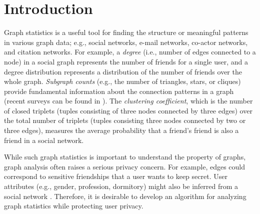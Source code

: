 \section{Introduction}
\label{sec:intro}
Graph statistics is a useful tool for finding the structure or meaningful patterns in various graph data; e.g., social networks, e-mail networks, co-actor networks, and citation networks. 
For example, 
a \textit{degree} (i.e., number of edges connected to a node) in a social graph represents the number of friends for a single user, and a degree distribution represents a distribution of the number of friends over the whole graph. 
\textit{Subgraph counts} 
(e.g., the number of triangles, stars, or cliques) provide fundamental information about the connection patterns in a graph (recent surveys can be found in \cite{Ribeiro_arXiv19}). 
The \textit{clustering coefficient}, which is the number of closed triplets (tuples consisting of three nodes connected by three edges)
over the total number of 
triplets (tuples consisting three nodes connected by two or three edges), 
measures the average probability that a friend's friend is also a friend in a social network. 

While such graph statistics is important to understand the property of graphs, 
graph analysis often raises a serious privacy concern. 
For example, 
edges could correspond to sensitive friendships 
that a user wants to keep secret. 
User attributes (e.g.,  gender, profession, dormitory) might also be inferred from a social network \cite{Dougnon_AI15,Mislove_WSDM10}.
Therefore, it is desirable to develop an algorithm for analyzing graph statistics while protecting user privacy.

